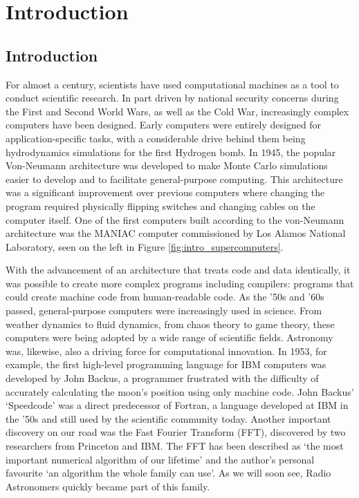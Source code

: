 \chapter{Introduction}

\section{Introduction}\label{sec:intro_intro}

For almost a century, scientists have used computational machines as a tool to conduct scientific research. In part driven by national security concerns during the First and Second World Wars, as well as the Cold War, increasingly complex computers have been designed. Early computers were entirely designed for application-specific tasks, with a considerable drive behind them being hydrodynamics simulations for the first Hydrogen bomb. In 1945, the popular Von-Neumann\citep{Neumann:1945:FDR:1102046} architecture was developed to make Monte Carlo simulations easier to develop and to facilitate general-purpose computing. This architecture was a significant improvement over previous computers where changing the program required physically flipping switches and changing cables on the computer itself. One of the first computers built according to the von-Neumann architecture was the MANIAC\citep{wood1985early} computer commissioned by Los Alamos National Laboratory, seen on the left in Figure \ref{fig:intro_supercomputers}.

With the advancement of an architecture that treats code and data identically, it was possible to create more complex programs including compilers: programs that could create machine code from human-readable code. As the '50s and '60s passed, general-purpose computers were increasingly used in science. From weather dynamics\citep{lorenz1956empirical} to fluid dynamics\citep{harlow1965numerical}, from chaos theory to game theory, these computers were being adopted by a wide range of scientific fields. Astronomy was, likewise, also a driving force for computational innovation. In 1953, for example, the first high-level programming language for IBM computers was developed by John Backus, a programmer frustrated with the difficulty of accurately calculating the moon's position using only machine code. John Backus' `Speedcode' was a direct predecessor of Fortran\citep{allen1981history}, a language developed at IBM in the '50s and still used by the scientific community today. Another important discovery on our road was the Fast Fourier Transform (FFT), discovered by two researchers from Princeton and IBM\citep{bingham1967modern}. The FFT has been described as `the most important numerical algorithm of our lifetime' and the author's personal favourite `an algorithm the whole family can use'\citep{top_10_algos}. As we will soon see, Radio Astronomers quickly became part of this family.

